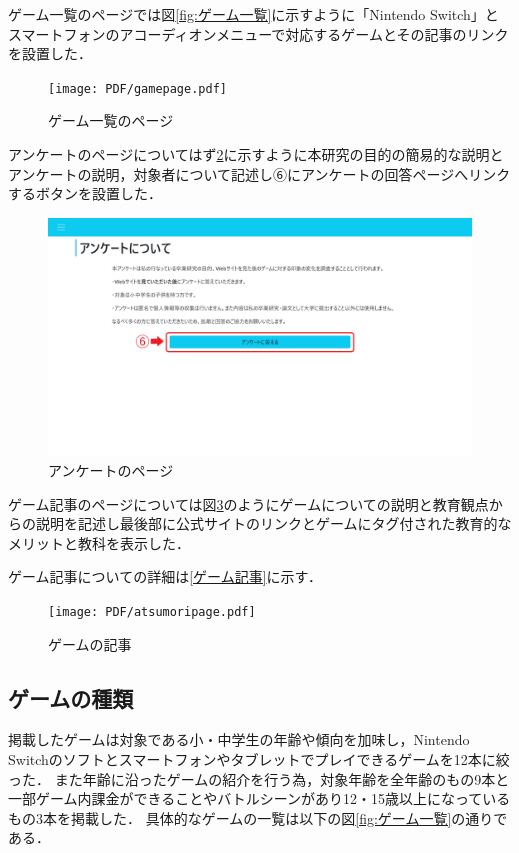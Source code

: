\documentclass[12pt,a4j,titlepage]{ltjsarticle}
\begin{document}
ゲーム一覧のページでは図\ref{fig:ゲーム一覧}に示すように「Nintendo Switch」とスマートフォンのアコーディオンメニューで対応するゲームとその記事のリンクを設置した．

\begin{figure}[H]
\begin{center}
 \texttt{[image: PDF/gamepage.pdf]}
\end{center}
 \caption{ゲーム一覧のページ}
 \label{fig:ゲーム一覧ページ}
\end{figure}

アンケートのページについてはず\ref{fig:アンケートページ}に示すように本研究の目的の簡易的な説明とアンケートの説明，対象者について記述し⑥にアンケートの回答ページへリンクするボタンを設置した．

\begin{figure}[H]
\begin{center}
 \includegraphics[keepaspectratio, scale=0.15]{PDF/anquepage.pdf}
\end{center}
 \caption{アンケートのページ}
 \label{fig:アンケートページ}
\end{figure}

ゲーム記事のページについては図\ref{fig:ゲームの記事}のようにゲームについての説明と教育観点からの説明を記述し最後部に公式サイトのリンクとゲームにタグ付された教育的なメリットと教科を表示した．

ゲーム記事についての詳細は\ref{ゲーム記事}に示す．

\begin{figure}[H]
\begin{center}
 \texttt{[image: PDF/atsumoripage.pdf]}
\end{center}
 \caption{ゲームの記事}
 \label{fig:ゲームの記事}
\end{figure}

\subsection{ゲームの種類}\label{ゲームの種類}
掲載したゲームは対象である小・中学生の年齢や傾向を加味し，Nintendo Switchのソフトとスマートフォンやタブレットでプレイできるゲームを12本に絞った．
また年齢に沿ったゲームの紹介を行う為，対象年齢を全年齢のもの9本と一部ゲーム内課金ができることやバトルシーンがあり12・15歳以上になっているもの3本を掲載した．
具体的なゲームの一覧は以下の図\ref{fig:ゲーム一覧}の通りである．
\end{document}
